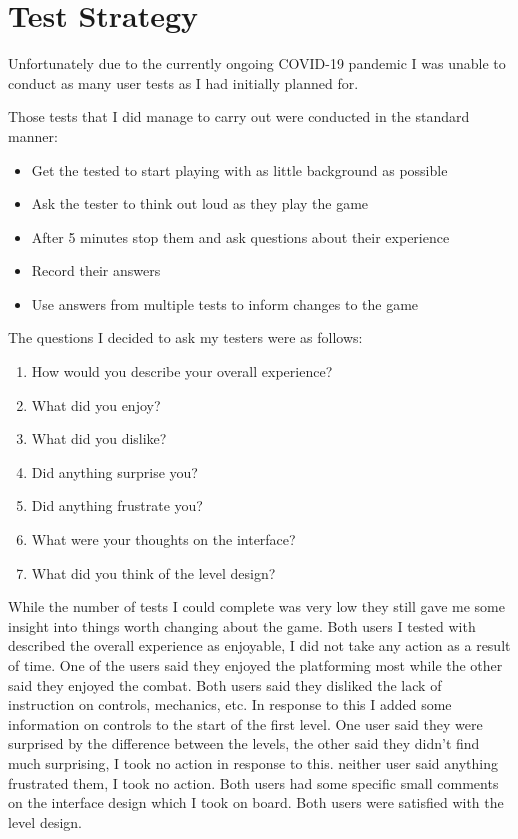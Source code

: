 \documentclass{article}
\begin{document}
\section{Test Strategy}

Unfortunately due to the currently ongoing COVID-19 pandemic I was unable to conduct as many user tests as I had initially planned for.

Those tests that I did manage to carry out were conducted in the standard manner:

\begin{itemize}
    \itemsep0em 
    \item Get the tested to start playing with as little background as possible
    \item Ask the tester to think out loud as they play the game
    \item After 5 minutes stop them and ask questions about their experience
    \item Record their answers
    \item Use answers from multiple tests to inform changes to the game
\end{itemize}

The questions I decided to ask my testers were as follows:
\begin{enumerate}
    \itemsep0em 
    \item How would you describe your overall experience?
    \item What did you enjoy?
    \item What did you dislike?
    \item Did anything surprise you?
    \item Did anything frustrate you?
    \item What were your thoughts on the interface?
    \item What did you think of the level design?
\end{enumerate}

While the number of tests I could complete was very low they still gave me some insight into things worth changing about the game.
Both users I tested with described the overall experience as enjoyable, I did not take any action as a result of time.
One of the users said they enjoyed the platforming most while the other said they enjoyed the combat.
Both users said they disliked the lack of instruction on controls, mechanics, etc.
In response to this I added some information on controls to the start of the first level.
One user said they were surprised by the difference between the levels, the other said they didn't find much surprising, I took no action in response to this.
neither user said anything frustrated them, I took no action.
Both users had some specific small comments on the interface design which I took on board.
Both users were satisfied with the level design.
\end{document}
